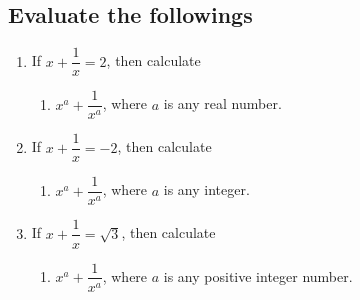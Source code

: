 	\subsection*{Evaluate the followings}
	\begin{enumerate}
			\item If $x+\dfrac{1}{x}= 2$, then calculate \begin{enumerate}[label=(\alph*)]
				\item $x^a+\dfrac{1}{x^a}$, where $a$ is any real number.
			\end{enumerate} 
			\item If $x+\dfrac{1}{x}= -2$, then calculate \begin{enumerate}[label=(\alph*)]
				\item $x^a+\dfrac{1}{x^a}$, where $a$ is any integer.
			\end{enumerate} 
			\item If $x+\dfrac{1}{x}= \sqrt{3}$, then calculate \begin{enumerate}[label=(\alph*)]
				\item $x^a+\dfrac{1}{x^a}$, where $a$ is any positive integer number.
				

\end{enumerate}
\end{enumerate}
